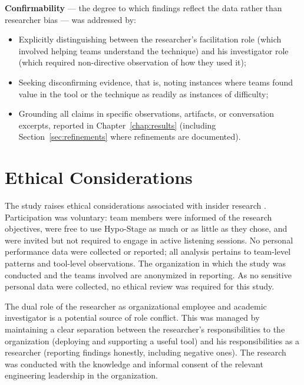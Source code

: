 \textbf{Confirmability} --- the degree to which findings reflect the data rather
than researcher bias --- was addressed by: 

\begin{itemize}
  \item[(i)] Explicitly distinguishing between the researcher's facilitation role (which involved helping teams understand the technique) and his investigator role (which required non-directive observation of how they used it);
  \item[(ii)] Seeking disconfirming evidence, that is, noting instances where teams found value in the tool or the technique as readily as instances of difficulty;
  \item[(iii)] Grounding all claims in specific observations, artifacts, or conversation excerpts, reported in Chapter~\ref{chap:results} (including Section~\ref{sec:refinements} where refinements are documented).
\end{itemize}

\section{Ethical Considerations}
\label{sec:ethical-considerations}

The study raises ethical considerations associated with insider research \citep{robson2016}. Participation was voluntary: team members were informed of the research objectives, were free to use Hypo-Stage as much or as little as they chose, 
and were invited but not required to engage in active listening sessions. No personal performance data were collected or reported; all analysis
pertains to team-level patterns and tool-level observations. The organization in which the study was conducted and the teams involved are anonymized in reporting.
As no sensitive personal data were collected, no ethical review was required for this study.

The dual role of the researcher as organizational employee and academic investigator is a potential source of role conflict. This was managed by maintaining a clear
separation between the researcher's responsibilities to the organization (deploying and supporting a useful tool) and his responsibilities as a researcher (reporting
findings honestly, including negative ones). The research was conducted with the knowledge and informal consent of the relevant engineering leadership in the organization.
